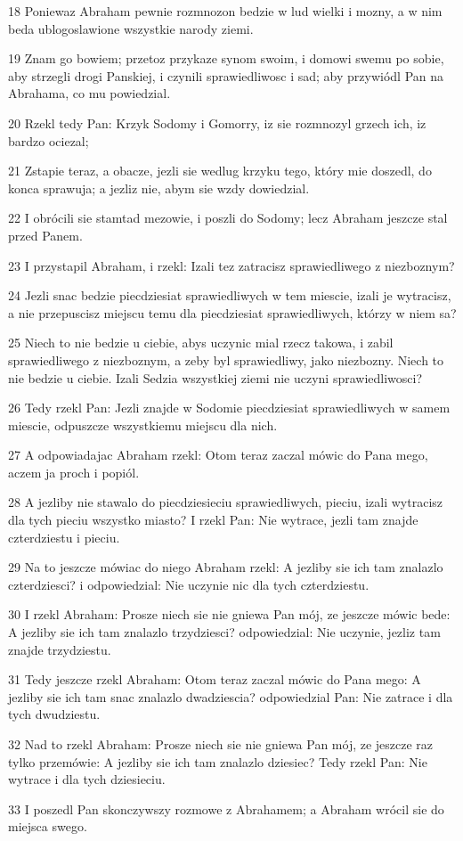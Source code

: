 \par 18 Poniewaz Abraham pewnie rozmnozon bedzie w lud wielki i mozny, a w nim beda ublogoslawione wszystkie narody ziemi.
\par 19 Znam go bowiem; przetoz przykaze synom swoim, i domowi swemu po sobie, aby strzegli drogi Panskiej, i czynili sprawiedliwosc i sad; aby przywiódl Pan na Abrahama, co mu powiedzial.
\par 20 Rzekl tedy Pan: Krzyk Sodomy i Gomorry, iz sie rozmnozyl grzech ich, iz bardzo ociezal;
\par 21 Zstapie teraz, a obacze, jezli sie wedlug krzyku tego, który mie doszedl, do konca sprawuja; a jezliz nie, abym sie wzdy dowiedzial.
\par 22 I obrócili sie stamtad mezowie, i poszli do Sodomy; lecz Abraham jeszcze stal przed Panem.
\par 23 I przystapil Abraham, i rzekl: Izali tez zatracisz sprawiedliwego z niezboznym?
\par 24 Jezli snac bedzie piecdziesiat sprawiedliwych w tem miescie, izali je wytracisz, a nie przepuscisz miejscu temu dla piecdziesiat sprawiedliwych, którzy w niem sa?
\par 25 Niech to nie bedzie u ciebie, abys uczynic mial rzecz takowa, i zabil sprawiedliwego z niezboznym, a zeby byl sprawiedliwy, jako niezbozny. Niech to nie bedzie u ciebie. Izali Sedzia wszystkiej ziemi nie uczyni sprawiedliwosci?
\par 26 Tedy rzekl Pan: Jezli znajde w Sodomie piecdziesiat sprawiedliwych w samem miescie, odpuszcze wszystkiemu miejscu dla nich.
\par 27 A odpowiadajac Abraham rzekl: Otom teraz zaczal mówic do Pana mego, aczem ja proch i popiól.
\par 28 A jezliby nie stawalo do piecdziesieciu sprawiedliwych, pieciu, izali wytracisz dla tych pieciu wszystko miasto? I rzekl Pan: Nie wytrace, jezli tam znajde czterdziestu i pieciu.
\par 29 Na to jeszcze mówiac do niego Abraham rzekl: A jezliby sie ich tam znalazlo czterdziesci? i odpowiedzial: Nie uczynie nic dla tych czterdziestu.
\par 30 I rzekl Abraham: Prosze niech sie nie gniewa Pan mój, ze jeszcze mówic bede: A jezliby sie ich tam znalazlo trzydziesci? odpowiedzial: Nie uczynie, jezliz tam znajde trzydziestu.
\par 31 Tedy jeszcze rzekl Abraham: Otom teraz zaczal mówic do Pana mego: A jezliby sie ich tam snac znalazlo dwadziescia? odpowiedzial Pan: Nie zatrace i dla tych dwudziestu.
\par 32 Nad to rzekl Abraham: Prosze niech sie nie gniewa Pan mój, ze jeszcze raz tylko przemówie: A jezliby sie ich tam znalazlo dziesiec? Tedy rzekl Pan: Nie wytrace i dla tych dziesieciu.
\par 33 I poszedl Pan skonczywszy rozmowe z Abrahamem; a Abraham wrócil sie do miejsca swego.

